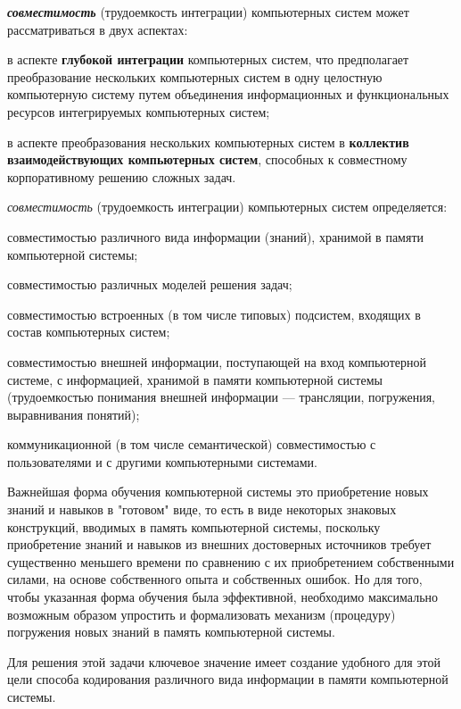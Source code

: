 \textbf{\textit{совместимость}} (трудоемкость интеграции) компьютерных систем может рассматриваться в двух аспектах:
\begin{textitemize}
	\item в аспекте \textbf{глубокой интеграции} компьютерных систем, что предполагает преобразование нескольких компьютерных систем в одну целостную компьютерную систему путем объединения информационных и функциональных ресурсов интегрируемых компьютерных систем;
	\item в аспекте преобразования нескольких компьютерных систем в \textbf{коллектив взаимодействующих компьютерных систем}, способных к совместному корпоративному решению сложных задач.
\end{textitemize}

\textit{совместимость} (трудоемкость интеграции) компьютерных систем определяется:
\begin{textitemize}
	\item совместимостью различного вида информации (знаний), хранимой в памяти компьютерной системы;
	\item совместимостью различных моделей решения задач;
	\item совместимостью встроенных (в том числе типовых) подсистем, входящих в состав компьютерных систем;
	\item совместимостью внешней информации, поступающей на вход компьютерной системе, с информацией, хранимой в памяти компьютерной системы (трудоемкостью понимания внешней информации --- трансляции, погружения, выравнивания понятий);
	\item коммуникационной (в том числе семантической) совместимостью с пользователями и с другими компьютерными системами.
\end{textitemize}

Важнейшая форма обучения компьютерной системы это приобретение новых знаний и навыков в "готовом"{} виде, то есть в виде некоторых знаковых конструкций, вводимых в память компьютерной системы, поскольку приобретение знаний и навыков из внешних достоверных источников требует существенно меньшего времени по сравнению с их приобретением собственными силами, на основе собственного опыта и собственных ошибок. Но для того, чтобы указанная форма обучения была эффективной, необходимо максимально возможным образом упростить и формализовать механизм (процедуру) погружения новых знаний в память компьютерной системы.

Для решения этой задачи ключевое значение имеет создание удобного для этой цели способа кодирования различного вида информации в памяти компьютерной системы.

